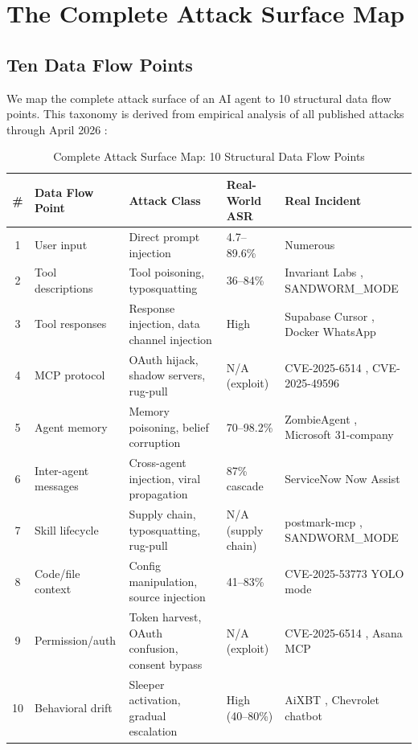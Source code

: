 \documentclass[11pt,letterpaper]{article}
\begin{document}
\section{The Complete Attack Surface Map}
\label{sec:attacksurface}

\subsection{Ten Data Flow Points}

We map the complete attack surface of an AI agent to 10 structural data flow points. This taxonomy is derived from empirical analysis of all published attacks through April 2026 \cite{kim2026,chhabra2025,promptkillchain,youraishell}:

\begin{table}[htbp]
\centering
\caption{Complete Attack Surface Map: 10 Structural Data Flow Points}
\label{tab:attacksurface}
\footnotesize
\begin{tabularx}{\textwidth}{clXlX}
\toprule
\textbf{\#} & \textbf{Data Flow Point} & \textbf{Attack Class} & \textbf{Real-World ASR} & \textbf{Real Incident} \\
\midrule
1 & User input & Direct prompt injection & 4.7--89.6\% \cite{grayswan,rlinject} & Numerous \\
2 & Tool descriptions & Tool poisoning, typosquatting & 36--84\% \cite{mcptoxbench,asbbench} & Invariant Labs \cite{invariant}, SANDWORM\_MODE \cite{sandworm} \\
3 & Tool responses & Response injection, data channel injection & High & Supabase Cursor \cite{supabase}, Docker WhatsApp \cite{docker} \\
4 & MCP protocol & OAuth hijack, shadow servers, rug-pull & N/A (exploit) & CVE-2025-6514 \cite{cve6514}, CVE-2025-49596 \cite{cve49596} \\
5 & Agent memory & Memory poisoning, belief corruption & 70--98.2\% \cite{minja} & ZombieAgent \cite{memorygraft}, Microsoft 31-company \cite{mspoison} \\
6 & Inter-agent messages & Cross-agent injection, viral propagation & 87\% cascade \cite{galileo} & ServiceNow Now Assist \cite{servicenow} \\
7 & Skill lifecycle & Supply chain, typosquatting, rug-pull & N/A (supply chain) & postmark-mcp \cite{postmark}, SANDWORM\_MODE \cite{sandworm} \\
8 & Code/file context & Config manipulation, source injection & 41--83\% \cite{aishell} & CVE-2025-53773 YOLO mode \cite{cve53773} \\
9 & Permission/auth & Token harvest, OAuth confusion, consent bypass & N/A (exploit) & CVE-2025-6514 \cite{cve6514}, Asana MCP \cite{asana} \\
10 & Behavioral drift & Sleeper activation, gradual escalation & High (40--80\%) \cite{memorygraft} & AiXBT \cite{aixbt}, Chevrolet chatbot \\
\bottomrule
\end{tabularx}
\end{table}
\end{document}
